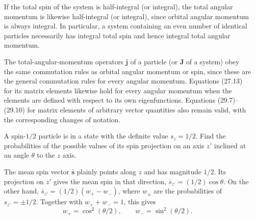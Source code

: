 If the total spin of the system is half-integral (or integral), the total
angular momentum is likewise half-integral (or integral), since orbital
angular momentum is always integral. In particular, a system containing an
even number of identical particles necessarily has integral total spin and
hence integral total angular momentum.

The total-angular-momentum operators $\mathbf j$ of a particle (or $\mathbf
J$ of a system) obey the same commutation rules as orbital angular momentum or
spin, since these are the general commutation rules for every angular
momentum. Equations (27.13) for its matrix elements likewise hold for every
angular momentum when the elements are defined with respect to its own
eigenfunctions. Equations (29.7)--(29.10) for matrix elements of arbitrary
vector quantities also remain valid, with the corresponding changes of
notation.

\ProblemHeading

A spin-$1/2$ particle is in a state with the definite value $s_z=1/2$. Find
the probabilities of the possible values of its spin projection on an axis
$z'$ inclined at an angle $\theta$ to the $z$ axis.

\SolutionHeading

The mean spin vector $\bar{\mathbf s}$ plainly points along $z$ and has
magnitude $1/2$. Its projection on $z'$ gives the mean spin in that direction,
$\bar s_{z'}=(1/2)\cos\theta$. On the other hand,
$\bar s_{z'}=(1/2)(w_+-w_-)$, where $w_\pm$ are the probabilities of
$s_{z'}=\pm1/2$. Together with $w_++w_-=1$, this gives
\[
 w_+=\cos^2(\theta/2),\qquad w_-=\sin^2(\theta/2).
\]
